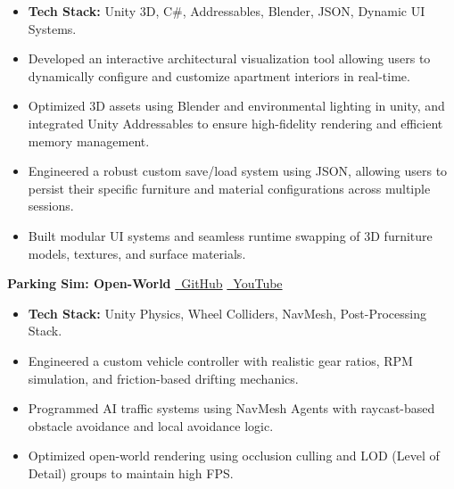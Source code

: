 \documentclass[10pt, letterpaper]{article}
\newenvironment{highlights}{
    \begin{itemize}[topsep=0.05cm, parsep=0.05cm, itemsep=0pt, leftmargin=10pt]
}{
    \end{itemize}
}
\begin{document}
\begin{onecolentry}
    \begin{highlights}
        \item \textbf{Tech Stack:} Unity 3D, C\#, Addressables, Blender, JSON, Dynamic UI Systems.
        \item Developed an interactive architectural visualization tool allowing users to dynamically configure and customize apartment interiors in real-time.
        \item Optimized 3D assets using Blender and environmental lighting in unity, and integrated Unity Addressables to ensure high-fidelity rendering and efficient memory management.
        \item Engineered a robust custom save/load system using JSON, allowing users to persist their specific furniture and material configurations across multiple sessions.
        \item Built modular UI systems and seamless runtime swapping of 3D furniture models, textures, and surface materials.
    \end{highlights}
\end{onecolentry}

\vspace{0.3cm}
\begin{twocolentry}{
    \textbf{Parking Sim: Open-World }
}
    \hfill  
    \href{https://github.com/hashiq-11/Parking-sim}{\faGithub~GitHub} \quad
    \href{https://youtu.be/oi_ZzzR7OEA}{\faYoutube~YouTube}
\end{twocolentry}

\vspace{0.1 cm}

\begin{onecolentry}
    \begin{highlights}
        \item \textbf{Tech Stack:} Unity Physics, Wheel Colliders, NavMesh, Post-Processing Stack.
        \item Engineered a custom vehicle controller with realistic gear ratios, RPM simulation, and friction-based drifting mechanics.
        \item Programmed AI traffic systems using NavMesh Agents with raycast-based obstacle avoidance and local avoidance logic.
        \item Optimized open-world rendering using occlusion culling and LOD (Level of Detail) groups to maintain high FPS.
    \end{highlights}
\end{onecolentry}
\end{document}
